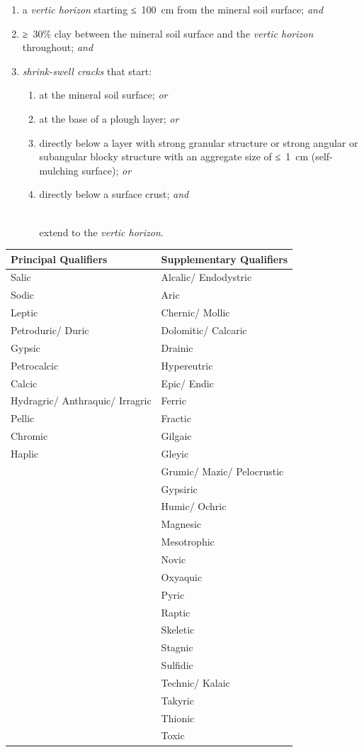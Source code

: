 \documentclass[
  letterpaper,
  DIV=11,
  numbers=noendperiod]{scrreprt}
\providecommand{\tightlist}{%
  \setlength{\itemsep}{0pt}\setlength{\parskip}{0pt}}\usepackage{longtable,booktabs,array}
\begin{document}
\begin{enumerate}
\def\labelenumi{\arabic{enumi}.}
\item
  a \emph{vertic horizon} starting ≤~100~cm from the mineral soil
  surface; \emph{and}
\item
  ≥~30\% clay between the mineral soil surface and the \emph{vertic
  horizon} throughout; \emph{and}
\item
  \emph{shrink-swell cracks} that start:

  \begin{enumerate}
  \def\labelenumii{\alph{enumii}.}
  \tightlist
  \item
    at the mineral soil surface; \emph{or}
  \item
    at the base of a plough layer; \emph{or}
  \item
    directly below a layer with strong granular structure or strong
    angular or subangular blocky structure with an aggregate size of
    ≤~1~cm (self-mulching surface); \emph{or}
  \item
    directly below a surface crust; \emph{and}\\
    \strut \\
    extend to the \emph{vertic horizon}.
  \end{enumerate}
\end{enumerate}

\begin{longtable}[]{@{}ll@{}}
\toprule()
Principal Qualifiers & Supplementary Qualifiers \\
\midrule()
\endhead
Salic & Alcalic/ Endodystric \\
Sodic & Aric \\
Leptic & Chernic/ Mollic \\
Petroduric/ Duric & Dolomitic/ Calcaric \\
Gypsic & Drainic \\
Petrocalcic & Hypereutric \\
Calcic & Epic/ Endic \\
Hydragric/ Anthraquic/ Irragric & Ferric \\
Pellic & Fractic \\
Chromic & Gilgaic \\
Haplic & Gleyic \\
& Grumic/ Mazic/ Pelocrustic \\
& Gypsiric \\
& Humic/ Ochric \\
& Magnesic \\
& Mesotrophic \\
& Novic \\
& Oxyaquic \\
& Pyric \\
& Raptic \\
& Skeletic \\
& Stagnic \\
& Sulfidic \\
& Technic/ Kalaic \\
& Takyric \\
& Thionic \\
& Toxic \\
\bottomrule()
\end{longtable}
\end{document}
